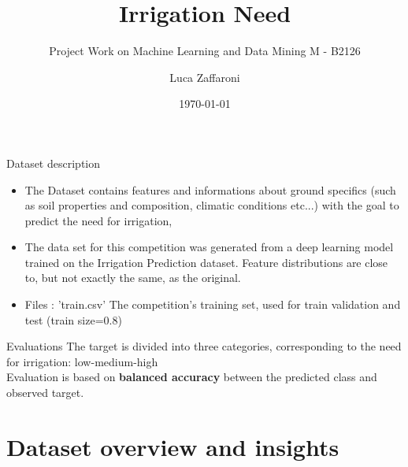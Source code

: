 \documentclass{beamer}
\title{Irrigation Need}
\subtitle{Project Work on Machine Learning and Data Mining M - B2126}
\author{Luca Zaffaroni}
\date{\today}
\begin{document}
\frame{\titlepage}

\begin{frame}{Dataset description}

\begin{itemize}
\item The Dataset contains features and informations about ground specifics  (such as soil properties and composition, climatic conditions etc...)  with the goal to predict the need for irrigation,

\item The data set for this competition was generated from a deep learning model trained on the Irrigation Prediction dataset. Feature distributions are close to, but not exactly the same, as the original.

\item Files : 'train.csv'
The competition's training set, used for train validation and test (train size=0.8)

\end{itemize}
\end{frame}

\begin{frame}{Evaluations}
The target is divided into three categories, corresponding to the need for irrigation: low-medium-high
\\Evaluation is based on \textbf{balanced accuracy} between the predicted class and observed target.

\end{frame}


\section{Dataset overview and insights}
\end{document}
